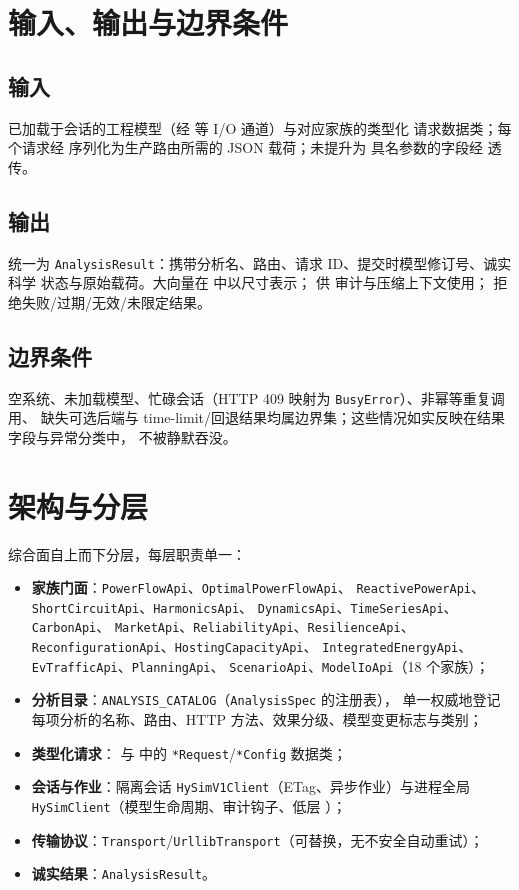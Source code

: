 \documentclass[UTF8,fontset=fandol,a4paper,11pt]{ctexart}
\begin{document}
\section{输入、输出与边界条件}
\subsection{输入}
已加载于会话的工程模型（经  等 I/O 通道）与对应家族的类型化
请求数据类；每个请求经  序列化为生产路由所需的 JSON 载荷；未提升为
具名参数的字段经  透传。

\subsection{输出}
统一为 \texttt{AnalysisResult}：携带分析名、路由、请求 ID、提交时模型修订号、诚实科学
状态与原始载荷。大向量在  中以尺寸表示； 供
审计与压缩上下文使用； 拒绝失败/过期/无效/未限定结果。

\subsection{边界条件}
空系统、未加载模型、忙碌会话（HTTP 409 映射为 \texttt{BusyError}）、非幂等重复调用、
缺失可选后端与 time-limit/回退结果均属边界集；这些情况如实反映在结果字段与异常分类中，
不被静默吞没。

\section{架构与分层}
综合面自上而下分层，每层职责单一：

\begin{itemize}
  \item \textbf{家族门面}：\texttt{PowerFlowApi}、\texttt{OptimalPowerFlowApi}、
        \texttt{ReactivePowerApi}、\texttt{ShortCircuitApi}、\texttt{HarmonicsApi}、
        \texttt{DynamicsApi}、\texttt{TimeSeriesApi}、\texttt{CarbonApi}、
        \texttt{MarketApi}、\texttt{ReliabilityApi}、\texttt{ResilienceApi}、
        \texttt{ReconfigurationApi}、\texttt{HostingCapacityApi}、
        \texttt{IntegratedEnergyApi}、\texttt{EvTrafficApi}、\texttt{PlanningApi}、
        \texttt{ScenarioApi}、\texttt{ModelIoApi}（18 个家族）；
  \item \textbf{分析目录}：\texttt{ANALYSIS\_CATALOG}（\texttt{AnalysisSpec} 的注册表），
        单一权威地登记每项分析的名称、路由、HTTP 方法、效果分级、模型变更标志与类别；
  \item \textbf{类型化请求}： 与  中的
        \texttt{*Request}/\texttt{*Config} 数据类；
  \item \textbf{会话与作业}：隔离会话 \texttt{HySimV1Client}（ETag、异步作业）与进程全局
        \texttt{HySimClient}（模型生命周期、审计钩子、低层 ）；
  \item \textbf{传输协议}：\texttt{Transport}/\texttt{UrllibTransport}（可替换，无不安全自动重试）；
  \item \textbf{诚实结果}：\texttt{AnalysisResult}。
\end{itemize}
\end{document}
